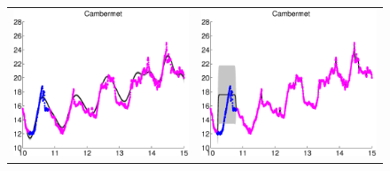 \begin{figure}
\centering
\begin{tabular}{cc}
\includegraphics[scale=0.3]{figures/slfm-weatherCambermet.eps} &
\includegraphics[scale=0.3]{figures/weatherCambermet.eps} \\

\end{tabular}
\end{figure}
